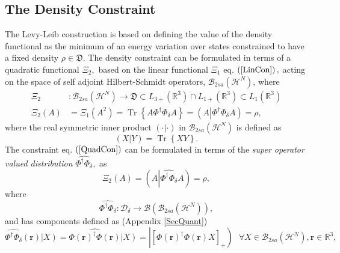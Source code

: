 \documentclass[aps,preprint]{revtex4}%
\begin{document}
\subsection{The Density Constraint\label{DenCon}}

The Levy-Leib construction \cite{Levy1979,Lieb1983} is based on defining the
value of the density functional as the minimum of an energy variation over
states constrained to have a fixed density $\rho\in\mathfrak{D}$. The density
constraint can be formulated in terms of a quadratic functional $\Xi_{2},$
based on the linear functional $\Xi_{1}$ eq. $\left(  \ref{LinCon}\right)  ,$
acting on the space of self adjoint Hilbert-Schmidt operators, $\mathcal{B}%
_{2sa}\left(  \mathcal{H}^{N}\right)  $, where
\begin{align}
\Xi_{2}  &  :\mathcal{B}_{2sa}\left(  \mathcal{H}^{N}\right)  \rightarrow
\mathfrak{D}\subset L_{3+}\left(  \mathbb{R}^{3}\right)  \cap L_{1+}\left(
\mathbb{R}^{3}\right)  \subset L_{1}\left(  \mathbb{R}^{3}\right) \nonumber\\
\Xi_{2}\left(  A\right)   &  =\Xi_{1}\left(  A^{2}\right)  =\operatorname{Tr}%
\left\{  A\Phi^{\dagger}\Phi_{\delta}A\right\}  =\left(  A\left\vert
\Phi^{\dagger}\Phi_{\delta}A\right.  \right)  =\rho, \label{QuadCon}%
\end{align}
where the real symmetric inner product $\left(  \cdot\left\vert \cdot\right.
\right)  $ in $\mathcal{B}_{2sa}\left(  \mathcal{H}^{N}\right)  $ is defined
as
\begin{equation}
\left(  X\left\vert Y\right.  \right)  =\operatorname{Tr}\left\{  XY\right\}
. \label{Opinner}%
\end{equation}
The constraint eq. $\left(  \ref{QuadCon}\right)  $ can be formulated in terms
of the \emph{super operator valued distribution} $\widehat{\Phi^{\dagger}%
\Phi_{\delta}},$ as%
\begin{equation}
\Xi_{2}\left(  A\right)  =\left(  A\left\vert \widehat{\Phi^{\dagger}%
\Phi_{\delta}}A\right.  \right)  =\rho,
\end{equation}
where
\begin{equation}
\widehat{\Phi^{\dagger}\Phi_{\delta}}:\mathcal{D}_{\mathcal{\delta}%
}\rightarrow\mathcal{B}\left(  \mathcal{B}_{2sa}\left(  \mathcal{H}%
^{N}\right)  \right)  ,
\end{equation}
and has components defined as (Appendix \ref{SecQuant})%
\begin{equation}
\widehat{\Phi^{\dagger}\Phi_{\delta}}\left(  \boldsymbol{r}\right)  \left\vert
X\right)  =\widehat{\Phi\left(  \boldsymbol{r}\right)  ^{\dagger}\Phi\left(
\boldsymbol{r}\right)  }\left\vert X\right)  =\left\vert \left[  \Phi\left(
\boldsymbol{r}\right)  ^{\dagger}\Phi\left(  \boldsymbol{r}\right)  X\right]
_{+}\right)  \text{ }\forall X\in\mathcal{B}_{2sa}\left(  \mathcal{H}%
^{N}\right)  ,\boldsymbol{r\in}\mathbb{R}^{3},
\end{equation}
\end{document}
